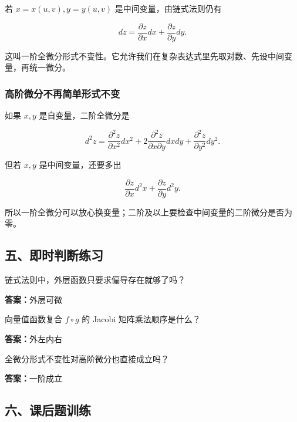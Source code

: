 若 \(x=x(u,v),y=y(u,v)\) 是中间变量，由链式法则仍有

\[
      dz=
      \frac{\partial z}{\partial x}dx+
      \frac{\partial z}{\partial y}dy.
    \]

这叫一阶全微分形式不变性。它允许我们在复杂表达式里先取对数、先设中间变量，再统一微分。

\subsubsection*{高阶微分不再简单形式不变}

如果 \(x,y\) 是自变量，二阶全微分是

\[
      d^2z=
      \frac{\partial^2z}{\partial x^2}dx^2
      +2\frac{\partial^2z}{\partial x\partial y}dxdy
      +\frac{\partial^2z}{\partial y^2}dy^2.
    \]

但若 \(x,y\) 是中间变量，还要多出

\[
      \frac{\partial z}{\partial x}d^2x+
      \frac{\partial z}{\partial y}d^2y.
    \]

\begin{notebox}
所以一阶全微分可以放心换变量；二阶及以上要检查中间变量的二阶微分是否为零。
\end{notebox}

\subsection*{五、即时判断练习}

\begin{quickcheck}
链式法则中，外层函数只要求偏导存在就够了吗？

\tcblower
\textbf{答案：}外层可微
\end{quickcheck}

\begin{quickcheck}
向量值函数复合 \(f\circ g\) 的 Jacobi 矩阵乘法顺序是什么？

\tcblower
\textbf{答案：}外左内右
\end{quickcheck}

\begin{quickcheck}
全微分形式不变性对高阶微分也直接成立吗？

\tcblower
\textbf{答案：}一阶成立
\end{quickcheck}

\subsection*{六、课后题训练}

